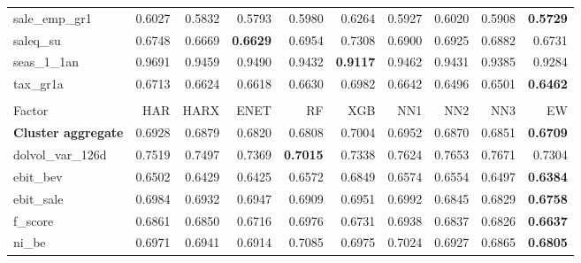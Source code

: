 \begin{longtable}{>{\raggedright\arraybackslash}p{2.6cm}rrrrrrrrr}
sale\_emp\_gr1 & 0.6027 & \cellcolor{blue!10}0.5832 & \cellcolor{blue!10}0.5793 & \cellcolor{blue!10}0.5980 & 0.6264 & \cellcolor{blue!10}0.5927 & \cellcolor{blue!10}0.6020 & \cellcolor{blue!10}0.5908 & \textbf{\cellcolor{blue!10}0.5729} \\
saleq\_su & 0.6748 & \cellcolor{blue!10}0.6669 & \textbf{\cellcolor{blue!10}0.6629} & 0.6954 & 0.7308 & 0.6900 & 0.6925 & 0.6882 & \cellcolor{blue!10}0.6731 \\
seas\_1\_1an & 0.9691 & \cellcolor{blue!10}0.9459 & \cellcolor{blue!10}0.9490 & \cellcolor{blue!10}0.9432 & \textbf{\cellcolor{blue!10}0.9117} & \cellcolor{blue!10}0.9462 & \cellcolor{blue!10}0.9431 & \cellcolor{blue!10}0.9385 & \cellcolor{blue!10}0.9284 \\
tax\_gr1a & 0.6713 & \cellcolor{blue!10}0.6624 & \cellcolor{blue!10}0.6618 & \cellcolor{blue!10}0.6630 & 0.6982 & \cellcolor{blue!10}0.6642 & \cellcolor{blue!10}0.6496 & \cellcolor{blue!10}0.6501 & \textbf{\cellcolor{blue!10}0.6462} \\
\hline
\multicolumn{10}{@{}l}{\textit{Panel H. Profitability}} \\
\hline
Factor & HAR & HARX & ENET & RF & XGB & NN1 & NN2 & NN3 & EW \\
\hline
\textbf{Cluster aggregate} & 0.6928 & \cellcolor{blue!10}0.6879 & \cellcolor{blue!10}0.6820 & \cellcolor{blue!10}0.6808 & 0.7004 & 0.6952 & \cellcolor{blue!10}0.6870 & \cellcolor{blue!10}0.6851 & \textbf{\cellcolor{blue!10}0.6709} \\
dolvol\_var\_126d & 0.7519 & \cellcolor{blue!10}0.7497 & \cellcolor{blue!10}0.7369 & \textbf{\cellcolor{blue!10}0.7015} & \cellcolor{blue!10}0.7338 & 0.7624 & 0.7653 & 0.7671 & \cellcolor{blue!10}0.7304 \\
ebit\_bev & 0.6502 & \cellcolor{blue!10}0.6429 & \cellcolor{blue!10}0.6425 & 0.6572 & 0.6849 & 0.6574 & 0.6554 & \cellcolor{blue!10}0.6497 & \textbf{\cellcolor{blue!10}0.6384} \\
ebit\_sale & 0.6984 & \cellcolor{blue!10}0.6932 & \cellcolor{blue!10}0.6947 & \cellcolor{blue!10}0.6909 & \cellcolor{blue!10}0.6951 & 0.6992 & \cellcolor{blue!10}0.6845 & \cellcolor{blue!10}0.6829 & \textbf{\cellcolor{blue!10}0.6758} \\
f\_score & 0.6861 & \cellcolor{blue!10}0.6850 & \cellcolor{blue!10}0.6716 & 0.6976 & \cellcolor{blue!10}0.6731 & 0.6938 & \cellcolor{blue!10}0.6837 & \cellcolor{blue!10}0.6826 & \textbf{\cellcolor{blue!10}0.6637} \\
ni\_be & 0.6971 & \cellcolor{blue!10}0.6941 & \cellcolor{blue!10}0.6914 & 0.7085 & 0.6975 & 0.7024 & \cellcolor{blue!10}0.6927 & \cellcolor{blue!10}0.6865 & \textbf{\cellcolor{blue!10}0.6805} \\

\end{longtable}
